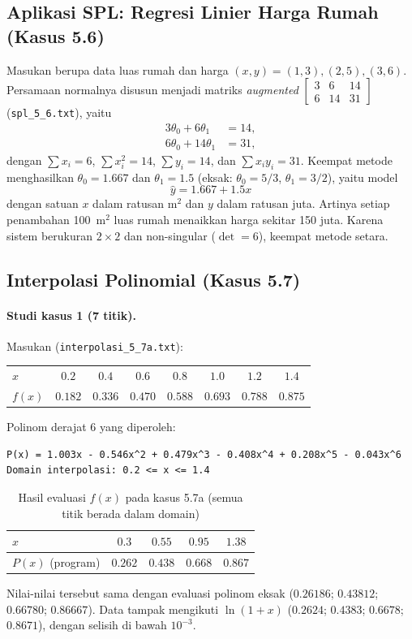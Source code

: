 \documentclass[12pt,a4paper]{article}
\begin{document}
\subsection{Aplikasi SPL: Regresi Linier Harga Rumah (Kasus 5.6)}
Masukan berupa data luas rumah dan harga $(x,y)=(1,3),(2,5),(3,6)$. Persamaan normalnya disusun menjadi matriks \textit{augmented} $\left[\begin{smallmatrix}3&6&14\\6&14&31\end{smallmatrix}\right]$ (\texttt{spl\_5\_6.txt}), yaitu
\begin{align*}
  3\theta_0+6\theta_1&=14,\\
  6\theta_0+14\theta_1&=31,
\end{align*}
dengan $\sum x_i=6$, $\sum x_i^2=14$, $\sum y_i=14$, dan $\sum x_iy_i=31$. Keempat metode menghasilkan $\theta_0=1.667$ dan $\theta_1=1.5$ (eksak: $\theta_0=5/3$, $\theta_1=3/2$), yaitu model
\[
  \hat y = 1.667 + 1.5x
\]
dengan satuan $x$ dalam ratusan $\text{m}^2$ dan $y$ dalam ratusan juta. Artinya setiap penambahan 100~$\text{m}^2$ luas rumah menaikkan harga sekitar 150 juta. Karena sistem berukuran $2\times2$ dan non-singular ($\det=6$), keempat metode setara.

\subsection{Interpolasi Polinomial (Kasus 5.7)}

\paragraph{Studi kasus 1 (7 titik).} Masukan (\texttt{interpolasi\_5\_7a.txt}):
\begin{center}\small
\begin{tabular}{@{}lccccccc@{}}
\toprule
$x$ & $0.2$ & $0.4$ & $0.6$ & $0.8$ & $1.0$ & $1.2$ & $1.4$\\
$f(x)$ & $0.182$ & $0.336$ & $0.470$ & $0.588$ & $0.693$ & $0.788$ & $0.875$\\
\bottomrule
\end{tabular}
\end{center}
Polinom derajat 6 yang diperoleh:
\begin{lstlisting}
P(x) = 1.003x - 0.546x^2 + 0.479x^3 - 0.408x^4 + 0.208x^5 - 0.043x^6
Domain interpolasi: 0.2 <= x <= 1.4
\end{lstlisting}
\begin{table}[H]
\centering\small
\begin{tabular}{@{}lcccc@{}}
\toprule
$x$ & $0.3$ & $0.55$ & $0.95$ & $1.38$\\
\midrule
$P(x)$ (program) & $0.262$ & $0.438$ & $0.668$ & $0.867$\\
\bottomrule
\end{tabular}
\caption{Hasil evaluasi $f(x)$ pada kasus 5.7a (semua titik berada dalam domain)}
\end{table}
Nilai-nilai tersebut sama dengan evaluasi polinom eksak ($0.26186$; $0.43812$; $0.66780$; $0.86667$). Data tampak mengikuti $\ln(1+x)$ ($0.2624$; $0.4383$; $0.6678$; $0.8671$), dengan selisih di bawah $10^{-3}$.
\end{document}
